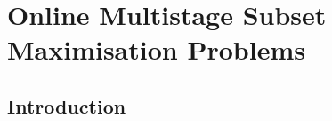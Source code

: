 \documentclass[a4paper]{book}
\begin{document}






\label{}



\chapter{Online Multistage Subset Maximisation Problems}

\section{Introduction}
\end{document}
